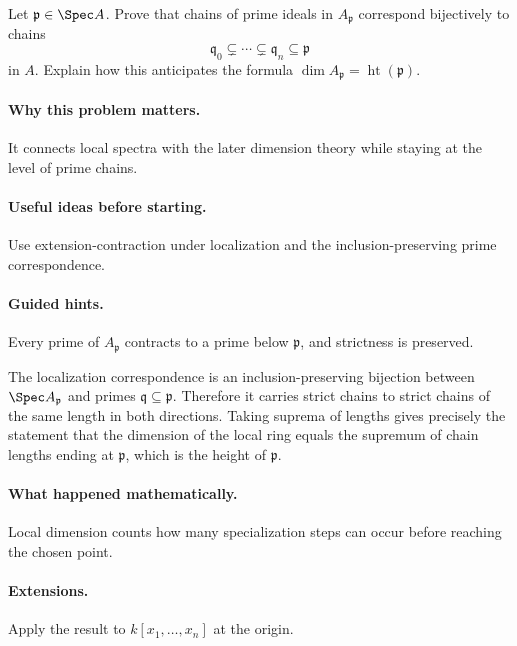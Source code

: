 \begin{problem}
Let $\mathfrak p\in\Spec A$.  Prove that chains of prime ideals in $A_{\mathfrak p}$ correspond bijectively to chains
\[
\mathfrak q_0\subsetneq\cdots\subsetneq\mathfrak q_n\subseteq\mathfrak p
\]
in $A$.  Explain how this anticipates the formula $\dim A_{\mathfrak p}=\operatorname{ht}(\mathfrak p)$.
\end{problem}

\paragraph{Why this problem matters.}
It connects local spectra with the later dimension theory while staying at the level of prime chains.

\paragraph{Useful ideas before starting.}
Use extension-contraction under localization and the inclusion-preserving prime correspondence.

\paragraph{Guided hints.}
Every prime of $A_{\mathfrak p}$ contracts to a prime below $\mathfrak p$, and strictness is preserved.

\begin{solution}
The localization correspondence is an inclusion-preserving bijection between $\Spec A_{\mathfrak p}$ and primes $\mathfrak q\subseteq\mathfrak p$.  Therefore it carries strict chains to strict chains of the same length in both directions.  Taking suprema of lengths gives precisely the statement that the dimension of the local ring equals the supremum of chain lengths ending at $\mathfrak p$, which is the height of $\mathfrak p$.
\end{solution}

\paragraph{What happened mathematically.}
Local dimension counts how many specialization steps can occur before reaching the chosen point.

\paragraph{Extensions.}
Apply the result to $k[x_1,\dots,x_n]$ at the origin.

